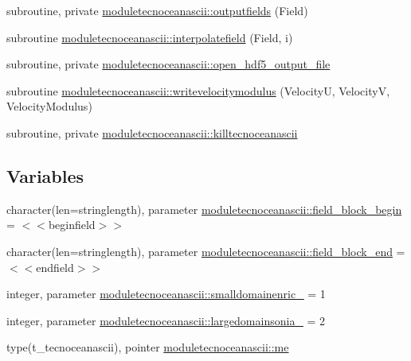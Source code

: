 \begin{DoxyCompactItemize}
\item 
subroutine, private \mbox{\hyperlink{namespacemoduletecnoceanascii_a690ef71c676ca809af1adce385db6855}{moduletecnoceanascii\+::outputfields}} (Field)
\item 
subroutine \mbox{\hyperlink{namespacemoduletecnoceanascii_a305beb20ba1bce59460e369c5385e130}{moduletecnoceanascii\+::interpolatefield}} (Field, i)
\item 
subroutine, private \mbox{\hyperlink{namespacemoduletecnoceanascii_a59efcea92a5574ed7914c0950859e175}{moduletecnoceanascii\+::open\+\_\+hdf5\+\_\+output\+\_\+file}}
\item 
subroutine \mbox{\hyperlink{namespacemoduletecnoceanascii_aa4e611e7a40208b6cd2a72c6a6ee06f7}{moduletecnoceanascii\+::writevelocitymodulus}} (VelocityU, VelocityV, Velocity\+Modulus)
\item 
subroutine, private \mbox{\hyperlink{namespacemoduletecnoceanascii_a324e7114be8b0d39a6c4a80c55f2dcc1}{moduletecnoceanascii\+::killtecnoceanascii}}
\end{DoxyCompactItemize}
\subsection*{Variables}
\begin{DoxyCompactItemize}
\item 
character(len=stringlength), parameter \mbox{\hyperlink{namespacemoduletecnoceanascii_a6e203357bcc95a95fdbd379800fe67d3}{moduletecnoceanascii\+::field\+\_\+block\+\_\+begin}} = \textquotesingle{}$<$$<$beginfield$>$$>$\textquotesingle{}
\item 
character(len=stringlength), parameter \mbox{\hyperlink{namespacemoduletecnoceanascii_ae09b9d3c02199141bcdb650b675af2ad}{moduletecnoceanascii\+::field\+\_\+block\+\_\+end}} = \textquotesingle{}$<$$<$endfield$>$$>$\textquotesingle{}
\item 
integer, parameter \mbox{\hyperlink{namespacemoduletecnoceanascii_a6fe13b67d048df63df18928a818d2859}{moduletecnoceanascii\+::smalldomainenric\+\_\+}} = 1
\item 
integer, parameter \mbox{\hyperlink{namespacemoduletecnoceanascii_a4ffd05d8c1e9d8c2e16164dfcb819fa2}{moduletecnoceanascii\+::largedomainsonia\+\_\+}} = 2
\item 
type(t\+\_\+tecnoceanascii), pointer \mbox{\hyperlink{namespacemoduletecnoceanascii_aee18ab90005a90ec638a6d2f9cb614f6}{moduletecnoceanascii\+::me}}
\end{DoxyCompactItemize}
